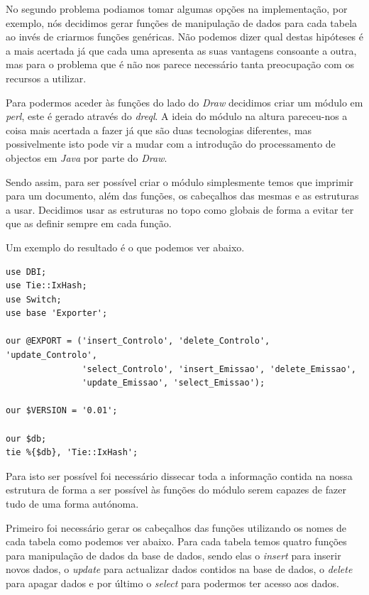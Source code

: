\documentclass[a4paper]{article}
\begin{document}
\hspace{1cm}No segundo problema podiamos tomar algumas opções na implementação, por exemplo, nós decidimos gerar funções de manipulação de dados para cada tabela ao invés de criarmos funções genéricas. Não podemos dizer qual destas hipóteses é a mais acertada já que cada uma apresenta as suas vantagens consoante a outra, mas para o problema que é não nos parece necessário tanta preocupação com os recursos a utilizar.

\hspace{1cm}Para podermos aceder às funções do lado do {\em Draw} decidimos criar um módulo em {\em perl}, este é gerado através do {\em dreql}. A ideia do módulo na altura pareceu-nos a coisa mais acertada a fazer já que são duas tecnologias diferentes, mas possivelmente isto pode vir a mudar com a introdução do processamento de objectos em {\em Java} por parte do {\em Draw}.

\hspace{1cm}Sendo assim, para ser possível criar o módulo simplesmente temos que imprimir para um documento, além das funções, os cabeçalhos das mesmas e as estruturas a usar. Decidimos usar as estruturas no topo como globais de forma a evitar ter que as definir sempre em cada função.

\hspace{1cm}Um exemplo do resultado é o que podemos ver abaixo.\\

\begin{small}
\begin{lstlisting}
use DBI;
use Tie::IxHash;
use Switch;
use base 'Exporter';

our @EXPORT = ('insert_Controlo', 'delete_Controlo', 'update_Controlo',
               'select_Controlo', 'insert_Emissao', 'delete_Emissao',
               'update_Emissao', 'select_Emissao');

our $VERSION = '0.01';

our $db;
tie %{$db}, 'Tie::IxHash';
\end{lstlisting}
\end{small}

\hspace{1cm}Para isto ser possível foi necessário dissecar toda a informação contida na nossa estrutura de forma a ser possível às funções do módulo serem capazes de fazer tudo de uma forma autónoma.

\hspace{1cm}Primeiro foi necessário gerar os cabeçalhos das funções utilizando os nomes de cada tabela como podemos ver abaixo. Para cada tabela temos quatro funções para manipulação de dados da base de dados, sendo elas o {\em insert} para inserir novos dados, o {\em update} para actualizar dados contidos na base de dados, o {\em delete} para apagar dados e por último o {\em select} para podermos ter acesso aos dados.\\
\end{document}
